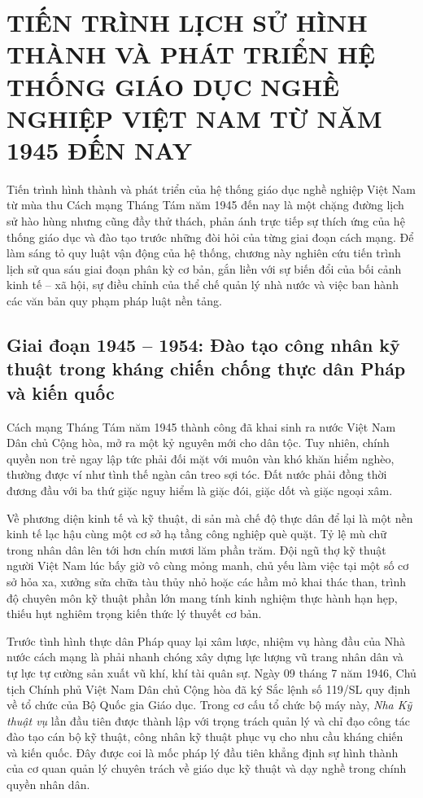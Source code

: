 \section{TIẾN TRÌNH LỊCH SỬ HÌNH THÀNH VÀ PHÁT TRIỂN HỆ THỐNG GIÁO DỤC NGHỀ NGHIỆP VIỆT NAM TỪ NĂM 1945 ĐẾN NAY}

Tiến trình hình thành và phát triển của hệ thống giáo dục nghề nghiệp Việt Nam từ mùa thu Cách mạng Tháng Tám năm 1945 đến nay là một chặng đường lịch sử hào hùng nhưng cũng đầy thử thách, phản ánh trực tiếp sự thích ứng của hệ thống giáo dục và đào tạo trước những đòi hỏi của từng giai đoạn cách mạng. Để làm sáng tỏ quy luật vận động của hệ thống, chương này nghiên cứu tiến trình lịch sử qua sáu giai đoạn phân kỳ cơ bản, gắn liền với sự biến đổi của bối cảnh kinh tế -- xã hội, sự điều chỉnh của thể chế quản lý nhà nước và việc ban hành các văn bản quy phạm pháp luật nền tảng.



\subsection{Giai đoạn 1945 -- 1954: Đào tạo công nhân kỹ thuật trong kháng chiến chống thực dân Pháp và kiến quốc}

Cách mạng Tháng Tám năm 1945 thành công đã khai sinh ra nước Việt Nam Dân chủ Cộng hòa, mở ra một kỷ nguyên mới cho dân tộc. Tuy nhiên, chính quyền non trẻ ngay lập tức phải đối mặt với muôn vàn khó khăn hiểm nghèo, thường được ví như tình thế ngàn cân treo sợi tóc. Đất nước phải đồng thời đương đầu với ba thứ giặc nguy hiểm là giặc đói, giặc dốt và giặc ngoại xâm. 

Về phương diện kinh tế và kỹ thuật, di sản mà chế độ thực dân để lại là một nền kinh tế lạc hậu cùng một cơ sở hạ tầng công nghiệp què quặt. Tỷ lệ mù chữ trong nhân dân lên tới hơn chín mươi lăm phần trăm. Đội ngũ thợ kỹ thuật người Việt Nam lúc bấy giờ vô cùng mỏng manh, chủ yếu làm việc tại một số cơ sở hỏa xa, xưởng sửa chữa tàu thủy nhỏ hoặc các hầm mỏ khai thác than, trình độ chuyên môn kỹ thuật phần lớn mang tính kinh nghiệm thực hành hạn hẹp, thiếu hụt nghiêm trọng kiến thức lý thuyết cơ bản.

Trước tình hình thực dân Pháp quay lại xâm lược, nhiệm vụ hàng đầu của Nhà nước cách mạng là phải nhanh chóng xây dựng lực lượng vũ trang nhân dân và tự lực tự cường sản xuất vũ khí, khí tài quân sự. Ngày 09 tháng 7 năm 1946, Chủ tịch Chính phủ Việt Nam Dân chủ Cộng hòa đã ký Sắc lệnh số 119/SL quy định về tổ chức của Bộ Quốc gia Giáo dục. Trong cơ cấu tổ chức bộ máy này, \textit{Nha Kỹ thuật vụ} lần đầu tiên được thành lập với trọng trách quản lý và chỉ đạo công tác đào tạo cán bộ kỹ thuật, công nhân kỹ thuật phục vụ cho nhu cầu kháng chiến và kiến quốc. Đây được coi là mốc pháp lý đầu tiên khẳng định sự hình thành của cơ quan quản lý chuyên trách về giáo dục kỹ thuật và dạy nghề trong chính quyền nhân dân.

